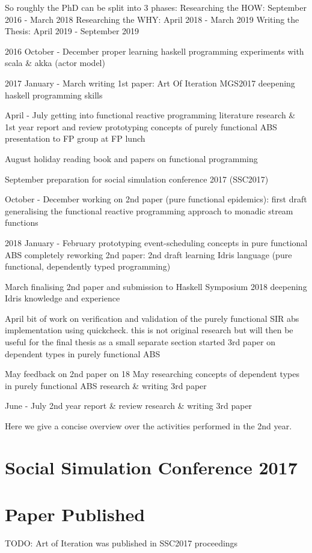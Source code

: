 So roughly the PhD can be split into 3 phases:
Researching the HOW: September 2016 - March 2018
Researching the WHY: April 2018 - March 2019
Writing the Thesis: April 2019 - September 2019

2016
October - December
	proper learning haskell programming
	experiments with scala \& akka (actor model)
	
2017
January - March
	writing 1st paper: Art Of Iteration
	MGS2017
	deepening haskell programming skills

April - July
	getting into functional reactive programming
	literature research \& 1st year report and review
	prototyping concepts of purely functional ABS
	presentation to FP group at FP lunch

August
	holiday
	reading book and papers on functional programming

September
	preparation for social simulation conference 2017 (SSC2017)

October - December
	working on 2nd paper (pure functional epidemics): first draft
	generalising the functional reactive programming approach to monadic stream functions 

2018
January - February
	prototyping event-scheduling concepts in pure functional ABS
	completely reworking 2nd paper: 2nd draft
	learning Idris language (pure functional, dependently typed programming)

March
	finalising 2nd paper and submission to Haskell Symposium 2018
	deepening Idris knowledge and experience 

April
	bit of work on verification and validation of the purely functional SIR abs implementation using quickcheck. this is not original research but will then be useful for the final thesis as a small separate section
	started 3rd paper on dependent types in purely functional ABS

May
	feedback on 2nd paper on 18 May	
	researching concepts of dependent types in purely functional ABS
	research \& writing 3rd paper

June - July
	2nd year report \& review
	research \& writing 3rd paper


Here we give a concise overview over the activities performed in the 2nd year.

\section{Social Simulation Conference 2017}


\section{Paper Published}
TODO: Art of Iteration was published in SSC2017 proceedings

